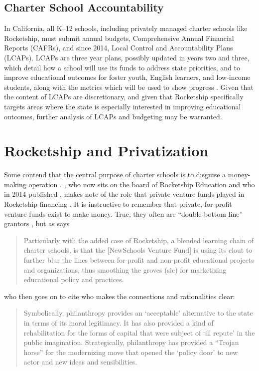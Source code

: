 \subsection{Charter School Accountability}\label{sec:charter-accountability}\indent

In California, all K–12 schools, including privately managed charter schools like Rocketship, must submit annual budgets, Comprehensive Annual Financial Reports (CAFRs), and since 2014, Local Control and Accountability Plans (LCAPs). LCAPs are three year plans, possibly updated in years two and three, which detail how a school will use its funds to address state priorities, and to improve educational outcomes for foster youth, English learners, and low-income students, along with the metrics which will be used to show progress \parencite[66–84]{Aguinaldo.etal2021}. Given that the content of LCAPs are discretionary, and given that Rocketship specifically targets areas where the state is especially interested in improving educational outcomes, further analysis of LCAPs and budgeting may be warranted.

\newpage
\section{Rocketship and Privatization}\label{sec:rocketship-privatization}\indent

Some contend that the central purpose of charter schools is to disguise a money-making operation \parencite{Saltman2018c}. \citeauthor{Whitmire2014}, who now sits on the board of Rocketship Education and who in 2014 published , makes note of the role that private venture funds played in Rocketship financing \parencite[25,65]{Whitmire2014}. It is instructive to remember that private, for-profit venture funds exist to make money. True, they often are ``double bottom line'' grantors \parencite{Clark.etal2004}, but as
\citeauthor{Tewksbury2016} says 
\blockquote[{\parencite[75]{Tewksbury2016}}][]{\SingleSpacing\vspace{-0.5\baselineskip}%
  Particularly with the added case of Rocketship, a blended learning chain of charter schools, is that the [NewSchools Venture Fund] is using its clout to further blur the lines between for-profit and non-profit educational projects and organizations, thus smoothing the groves (sic) for marketizing educational policy and practices.}
who then goes on to cite \citeauthor{Ball2012} who makes the connections and rationalities clear:
\blockquote[{\parencite[32]{Ball2012}}][]{\SingleSpacing\vspace{-0.5\baselineskip}%
Symbolically, philanthropy provides an `acceptable' alternative to the state in terms of its moral legitimacy.  It has also provided a kind of rehabilitation for the forms of capital that were subject of `ill repute' in the public imagination. Strategically, philanthropy has provided a ``Trojan horse'' for the modernizing move that opened the `policy door' to new actor and new ideas and sensibilities.}
  
